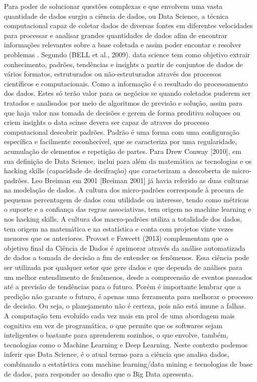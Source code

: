    Para poder de solucionar questões complexas e que envolvem uma vasta quantidade de dados surgiu a  ciência de dados, ou Data Science, a técnica computacional capaz de coletar dados de diversas fontes em  diferentes velocidades para processar e analisar grandes quantidades de dados afim de encontrar informações relevantes sobre a base coletada e assim poder encontar e resolver problemas . Segundo (BELL et al., 2009).   data science tem como objetivo extrair conhecimento, padrões, tendências e insights a partir de conjuntos de dados de vários formatos, estruturados ou não-estruturados através dos  processos científicos e computacionais. Como a  informação é o resultado do processamento dos dados. Estes  só terão valor para os negócios se quando coletados puderem ser tratados e analisados por meio de algoritmos de  previsão e solução,  assim para que haja valor nas tomada de decisões e gerem de forma preditiva soluçoes ou criem insights o data scinse devera ser capaz de  atraves do processo computacional descobrir padrões. 
  Padrão é uma forma com uma configuração específica e facilmente reconhecível, que se caracteriza por uma regularidade, acumulação de elementos e repetição de partes. Para Drew Conway [2010], em sua definição de Data Science, inclui para além da matemática as tecnologias e os hacking skills (capacidade de decifração) que caracterizam a descoberta de micro-padrões. Leo Breiman em 2001 [Breiman 2001] já havia referido as duas culturas na modelação de dados. A cultura dos micro-padrões corresponde à procura de pequenas percentagem de dados com utilidade ou interesse, tendo como métricas o suporte e a confiança das regras associativas, tem origem no machine learning e nos hacking skills. A cultura dos macro-padrões utiliza a totalidade dos dados, tem origem na matemática e na estatística e conta com projetos vinte vezes menores que os anteriores. 
  Provost e Fawcett (2013)  complementam que o objetivo final da Ciência de Dados é aprimorar através da análise automatizada de dados a tomada de decisão a fim de entender os fenômenos. Essa ciência pode ser utilizada por qualquer setor que gere dados e que dependa de análises para um melhor entendimento de fenômenos, desde a compreensão de eventos passados até a previsão de tendências para o futuro. Porém é importante lembrar que a predição não garante o futuro, é apenas uma ferramenta para melhorar o processo de decisão. Ou seja, o planejamento não é certeza, pois não está imune a falhas.  A computação tem evoluído cada vez mais em prol de uma abordagem mais cognitiva em vez de programática, o que permite que os softwares sejam inteligentes o bastante para aprenderem sozinhos, o que envolve, também, tecnologias como o Machine Learning e Deep Learning. Neste contexto podemos inferir que Data Science, é o atual termo para a ciência que analisa dados, combinando a estatística com machine learning/data mining e tecnologias de base de dados, para responder ao desafio que o Big Data apresenta. 

